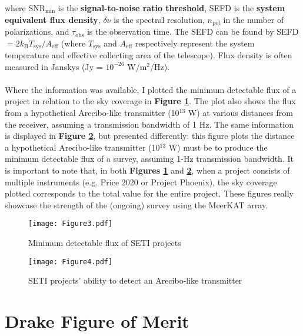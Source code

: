 \documentclass{article}
\begin{document}
where SNR$_{\textrm{min}}$ is the \textbf{signal-to-noise ratio threshold}, SEFD is the \textbf{system equivalent flux density}, $\delta \nu$ is the spectral resolution, $n_{\textrm{pol}}$ in the number of polarizations, and $\tau_{\textrm{obs}}$ is the observation time. The SEFD can be found by SEFD $= 2 k_{\textrm{B}} T_{\textrm{sys}} / A_{\textrm{eff}}$ (where $T_{\textrm{sys}}$ and $A_{\textrm{eff}}$ respectively represent the system temperature and effective collecting area of the telescope). Flux density is often measured in Janskys (Jy = $10^{-26}$ W/m$^2$/Hz).

\paragraph{}
Where the information was available, I plotted the minimum detectable flux of a project in relation to the sky coverage in \textbf{Figure \ref{fig4}}. The plot also shows the flux from a hypothetical Arecibo-like transmitter (10$^{13}$ W) at various distances from the receiver, assuming a transmission bandwidth of 1 Hz. The same information is displayed in \textbf{Figure \ref{fig5}}, but presented differently: this figure plots the distance a hypothetical Arecibo-like transmitter (10$^{13}$ W) must be to produce the minimum detectable flux of a survey, assuming 1-Hz transmission bandwidth. It is important to note that, in both \textbf{Figures \ref{fig4}} and \textbf{\ref{fig5}}, when a project consists of multiple instruments (e.g. Price 2020 or Project Phoenix), the sky coverage plotted corresponds to the total value for the entire project. These figures really showcase the strength of the (ongoing) survey using the MeerKAT array.

\begin{figure}[H]
\begin{center}
\texttt{[image: Figure3.pdf]}
\caption{Minimum detectable flux of SETI projects \textbf{\label{fig4}}}
\end{center}
\end{figure}

\begin{figure}[H]
\begin{center}
\texttt{[image: Figure4.pdf]}
\caption{SETI projects' ability to detect an Arecibo-like transmitter \textbf{\label{fig5}}}
\end{center}
\end{figure}


\section{Drake Figure of Merit}
\end{document}
